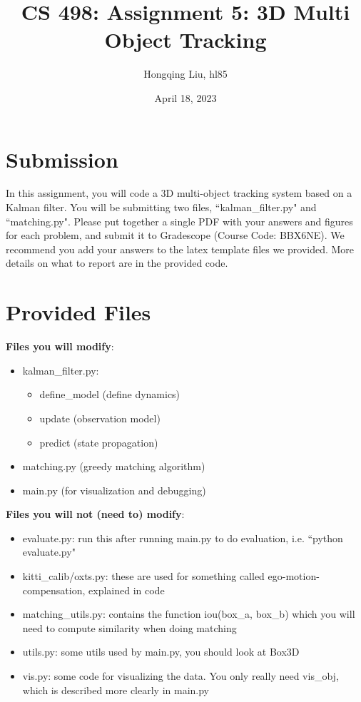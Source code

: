 \documentclass[11pt]{article}
\begin{document}
\author{Hongqing Liu, hl85}
\title{CS 498: Assignment 5: 3D Multi Object Tracking}
\date{April 18, 2023}
\maketitle

\medskip


\section*{Submission}

In this assignment, you will code a 3D multi-object tracking system based on a Kalman filter. You will be submitting two files, ``kalman\_filter.py" and ``matching.py". Please put together a single PDF with your answers and figures for each problem, and submit it to Gradescope (Course Code: BBX6NE). 
We recommend you add your answers to the latex template files we provided. More details on what to report are in the provided code. 

\section*{Provided Files}

\textbf{Files you will modify}:
\begin{itemize}
    \item kalman\_filter.py: 
    \begin{itemize}
        \item define\_model (define dynamics)
        \item update (observation model)
        \item predict (state propagation)
    \end{itemize}
    \item matching.py (greedy matching algorithm)
    \item main.py (for visualization and debugging)
\end{itemize}

\noindent \textbf{Files you will not (need to) modify}:
\begin{itemize}
    \item evaluate.py: run this after running main.py to do evaluation, i.e. ``python evaluate.py"
    \item kitti\_calib/oxts.py: these are used for something called ego-motion-compensation, explained in code
    \item matching\_utils.py: contains the function iou(box\_a, box\_b) which you will need to compute similarity when doing matching
    \item utils.py: some utils used by main.py, you should look at Box3D
    \item vis.py: some code for visualizing the data. You only really need vis\_obj, which is described more clearly in main.py
\end{itemize}
\end{document}
